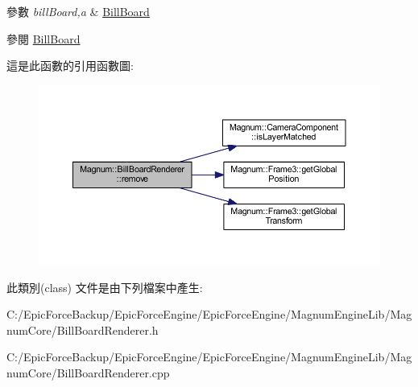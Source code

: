 \begin{DoxyParams}{參數}
{\em bill\+Board,a} & \hyperlink{class_magnum_1_1_bill_board}{Bill\+Board} \\
\hline
\end{DoxyParams}
\begin{DoxySeeAlso}{參閱}
\hyperlink{class_magnum_1_1_bill_board}{Bill\+Board} 
\end{DoxySeeAlso}


這是此函數的引用函數圖\+:\nopagebreak
\begin{figure}[H]
\begin{center}
\leavevmode
\includegraphics[width=350pt]{class_magnum_1_1_bill_board_renderer_a551846a61bfad0c3104bd75136e37a7e_cgraph}
\end{center}
\end{figure}




此類別(class) 文件是由下列檔案中產生\+:\begin{DoxyCompactItemize}
\item 
C\+:/\+Epic\+Force\+Backup/\+Epic\+Force\+Engine/\+Epic\+Force\+Engine/\+Magnum\+Engine\+Lib/\+Magnum\+Core/Bill\+Board\+Renderer.\+h\item 
C\+:/\+Epic\+Force\+Backup/\+Epic\+Force\+Engine/\+Epic\+Force\+Engine/\+Magnum\+Engine\+Lib/\+Magnum\+Core/Bill\+Board\+Renderer.\+cpp\end{DoxyCompactItemize}
